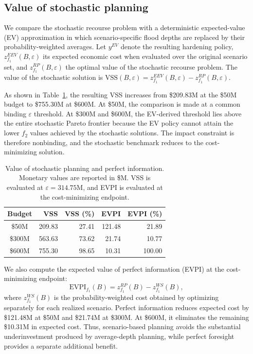 \documentclass[preprint,11pt,authoryear]{elsarticle}
\begin{document}
\subsection{Value of stochastic planning}
\label{sec:VSS}

We compare the stochastic recourse problem with a deterministic
expected-value (EV) approximation in which scenario-specific flood depths are
replaced by their probability-weighted averages. Let $y^{EV}$ denote the resulting
hardening policy, $z_{f_1}^{EEV}(B,\varepsilon)$ its expected economic cost
when evaluated over the original scenario set, and
$z_{f_1}^{RP}(B,\varepsilon)$ the optimal value of the stochastic recourse problem. The value of the stochastic solution is
$\mathrm{VSS}(B,\varepsilon)
=
z_{f_1}^{EEV}(B,\varepsilon)
-
z_{f_1}^{RP}(B,\varepsilon)$.

 As shown in
Table~\ref{tbl:stochastic_value}, the resulting VSS increases from \$209.83M
at the \$50M budget to \$755.30M at \$600M. At \$50M, the comparison is made
at a common binding $\varepsilon$ threshold. At \$300M and \$600M, the EV-derived threshold lies above the entire stochastic Pareto frontier because the EV policy cannot attain the lower $f_2$ values achieved by the stochastic solutions. The impact constraint is
therefore nonbinding, and the stochastic benchmark reduces to the cost-minimizing solution.

\begin{table}[H]
\centering
\small
\setlength{\tabcolsep}{5pt}
\caption{Value of stochastic planning and perfect information. Monetary
values are reported in \$M. VSS is evaluated at
$\varepsilon=314.75$M, and EVPI is evaluated at the cost-minimizing endpoint.}
\label{tbl:stochastic_value}
\begin{tabular}{crrrr}
\toprule
Budget
& VSS
& VSS (\%)
& EVPI
& EVPI (\%) \\
\midrule
\$50M  & 209.83 & 27.41 & 121.48 & 21.89 \\
\$300M & 563.63 & 73.62 &  21.74 & 10.77 \\
\$600M & 755.30 & 98.65 &  10.31 & 100.00 \\
\bottomrule
\end{tabular}
\end{table}

We also compute the expected value of perfect information (EVPI) at the
cost-minimizing endpoint:
\[
\mathrm{EVPI}_{f_1}(B)
=
z_{f_1}^{RP}(B)-z_{f_1}^{WS}(B),
\]
where $z_{f_1}^{WS}(B)$ is the probability-weighted cost obtained by optimizing
separately for each realized scenario. Perfect information reduces expected
cost by \$121.48M at \$50M and \$21.74M at \$300M. At \$600M, it eliminates
the remaining \$10.31M in expected cost. Thus, scenario-based planning avoids
the substantial underinvestment produced by average-depth planning, while
perfect foresight provides a separate additional benefit.
\end{document}
